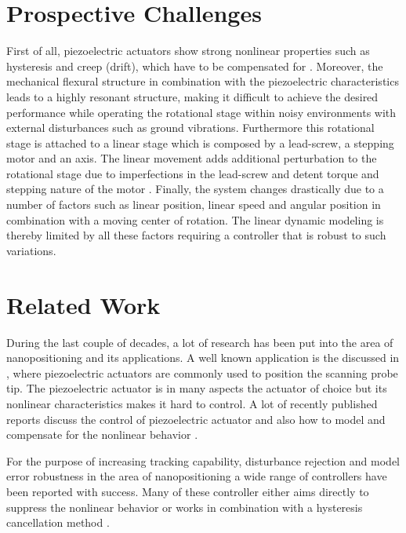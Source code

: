 \newpage
\section{Prospective Challenges}\label{sec:prospectiveChallanges}
First of all, piezoelectric actuators show strong nonlinear properties such as hysteresis and creep (drift), which have to be compensated for \citep{Piezo:2008}. Moreover, the mechanical flexural structure in combination with the piezoelectric characteristics leads to a highly resonant structure, making it difficult to achieve the desired performance while operating the rotational stage within noisy environments with external disturbances such as ground vibrations. Furthermore this rotational stage is attached to a linear stage which is composed by a lead-screw, a stepping motor and an axis. The linear movement adds additional perturbation to the rotational stage due to imperfections in the lead-screw and detent torque and stepping nature of the motor \citep{ButcherController:2015}. Finally, the system changes drastically due to a number of factors such as linear position, linear speed and angular position in combination with a moving center of rotation. The linear dynamic modeling is thereby limited by all these factors requiring a controller that is robust to such variations.

\section{Related Work}
During the last couple of decades, a lot of research has been put into the area of nanopositioning and its applications. A well known application is the \abbrAFM discussed in \citep{chuang2013robust, SurveyOfControlIssues:2007}, where piezoelectric actuators are commonly used to position the scanning probe tip. The piezoelectric actuator is in many aspects the actuator of choice but its nonlinear characteristics makes it hard to control. A lot of recently published reports discuss the control of piezoelectric actuator \citep{gu2013motion, gu2016modeling} and also how to model and compensate for the nonlinear behavior \citep{Biggio:2014,ButcherIdentification:2015,Maxwell:2012,leang2002hysteresis}.

For the purpose of increasing tracking capability, disturbance rejection and model error robustness in the area of nanopositioning a wide range of controllers have been reported with success. Many of these controller either aims directly to suppress the nonlinear behavior \citep{ompc, Elmali:1996, xu2014model} or works in combination with a hysteresis cancellation method \citep{inputshaper, gu:2014}.

